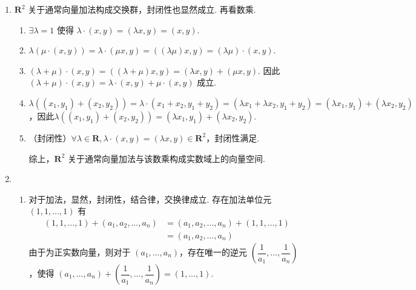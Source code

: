 \begin{exercise}
\begin{exgroup}
\begin{answer}
\begin{enumerate}
                \item $\mathbf{R}^2$ 关于通常向量加法构成交换群，封闭性也显然成立. 再看数乘.
                      \begin{enumerate}
                          \item $\exists \lambda=1$ 使得 $\lambda\cdot(x,y)=(\lambda x,y)=(x,y)$.

                          \item $\lambda(\mu\cdot(x,y))=\lambda\cdot(\mu x,y)=((\lambda\mu)x,y)=(\lambda\mu)\cdot(x,y)$.

                          \item $(\lambda+\mu)\cdot(x,y)=((\lambda+\mu)x,y)=(\lambda x,y)+(\mu x,y)$. 因此$(\lambda+\mu)\cdot(x,y)=\lambda\cdot(x,y)+\mu\cdot(x,y)$ 成立.

                          \item $\lambda((x_1,y_1)+(x_2,y_2))=\lambda\cdot(x_1+x_2,y_1+y_2)=(\lambda x_1+\lambda x_2,y_1+y_2)=(\lambda x_1,y_1)+(\lambda x_2,y_2)$，因此$\lambda((x_1,y_1)+(x_2,y_2))=(\lambda x_1,y_1)+(\lambda x_2,y_2)$.

                          \item （封闭性）$\forall \lambda \in \mathbf{R},\lambda\cdot(x,y)=(\lambda x,y)\in \mathbf{R}^2$，封闭性满足.

                                综上，$\mathbf{R}^2$ 关于通常向量加法与该数乘构成实数域上的向量空间.
                      \end{enumerate}

                \item \begin{enumerate}
                          \item 对于加法，显然，封闭性，结合律，交换律成立. 存在加法单位元 $(1,1,\ldots,1)$ 有
                                \begin{align*}
                                    (1,1,\ldots,1)+(a_1,a_2,\ldots,a_n) & = (a_1,a_2,\ldots,a_n)+(1,1,\ldots,1) \\
                                                                        & = (a_1,a_2,\ldots,a_n)
                                \end{align*}
                                由于为正实数向量，则对于 $(a_1,\ldots,a_n)$，存在唯一的逆元 $\left(\dfrac 1{a_1},\ldots,\dfrac 1{a_n}\right)$，使得 $(a_1,\ldots,a_n)+\left(\dfrac 1{a_1},\ldots,\dfrac 1{a_n}\right)=(1,\ldots,1)$.


\end{enumerate}
\end{enumerate}
\end{answer}
\end{exgroup}
\end{exercise}
